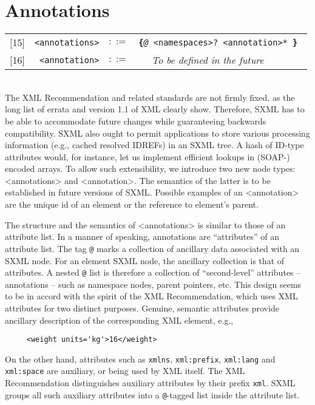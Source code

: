\documentclass[10pt]{article}
\begin{document}
\section{Annotations}
\begin{tabular}{rrcp{2.8in}}
{[}15{]} & \texttt{<annotations>} &  $::=$ & \texttt{\texttt{\textbf{\{}}{\itshape @} <namespaces>? <annotation>*\texttt{ \textbf{\}}} } \\
{[}16{]} & \texttt{<annotation>} &  $::=$ & \texttt{~ } \emph{To be defined in the future}\\
\end{tabular}
\\
The XML Recommendation and related standards are not firmly
fixed, as the long list of errata and version 1.1 of XML
clearly show. Therefore, SXML has to be able to accommodate future
changes while guaranteeing backwards compatibility. SXML also ought to
permit applications to store various processing information (e.g.,
cached resolved IDREFs) in an SXML tree. A hash of ID-type attributes
would, for instance, let us implement efficient lookups in (SOAP-)
encoded arrays. To allow such extensibility, we introduce two new node
types: <annotations> and <annotation>. The
semantics of the latter is to be established in future versions of
SXML. Possible examples of an <annotation> are the unique
id of an element or the reference to element's parent.

The structure and the semantics of <annotations>
is similar to those of an attribute list. In a manner of speaking,
annotations are ``attributes'' of an attribute list. The tag
\texttt{@} marks a collection of ancillary data associated
with an SXML node. For an element SXML node, the ancillary collection
is that of attributes. A nested \texttt{@} list is therefore a
collection of ``second-level'' attributes -- annotations -- such as
namespace nodes, parent pointers, etc. This design seems to be in
accord with the spirit of the XML Recommendation, which uses XML
attributes for two distinct purposes. Genuine, semantic attributes
provide ancillary description of the corresponding XML element,
e.g.,

\begin{verbatim}
     <weight units='kg'>16</weight>
\end{verbatim}
On the other hand, attributes such as \texttt{xmlns}, \texttt{xml:prefix}, \texttt{xml:lang} and \texttt{xml:space} are
auxiliary, or being used by XML itself.  The XML Recommendation
distinguishes auxiliary attributes by their prefix
\texttt{xml}. SXML groups all such auxiliary attributes into a
\texttt{@}-tagged list inside the attribute list.
\end{document}
